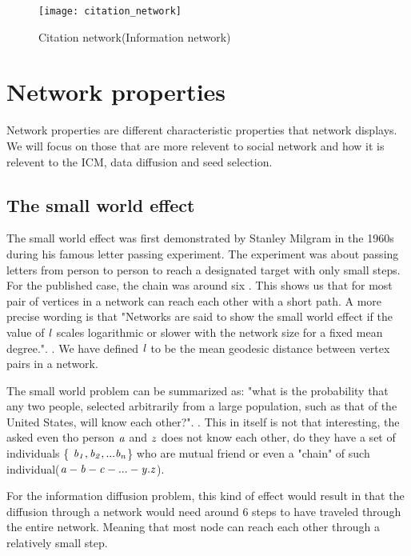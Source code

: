 \begin{figure}[!ht]
\centering
	\texttt{[image: citation\_network]}
	\caption{Citation network(Information network)} 
	\label{fig:CitationN}
\end{figure}

\section{Network properties}
Network properties are different characteristic properties that network displays. We will focus on those that are more relevent to social network and how it is relevent to the ICM, data diffusion and seed selection.


\subsection{The small world effect}\label{sec:SmallWorldEffect}

The small world effect was first demonstrated by Stanley Milgram in the 1960s during his famous letter passing experiment\cite{SmallWorldProblemSmilgram1960}. The experiment was about passing letters from person to person to reach a designated target with only small steps. For the published case, the chain was around six \cite{Experiment1969}. This shows us that for most pair of vertices in a network can reach each other with a short path. A more precise wording is that "Networks are said to show the small world effect if the value of $\it{l}$ scales logarithmic or slower with the network size for a fixed mean degree.". \cite{ComplexNetwork2003}. We have defined $\it{l} $ to be the mean geodesic distance between vertex pairs in a network.

The small world problem can be summarized as: "what is the probability that any two people, selected arbitrarily from a large population, such as that of the United States, will know each other?". \cite{smallworldExperiment1969}. This in itself is not that interesting, the \cite{SmallworldExperiment1969} asked even tho  person $\it{a}$ and $\it{z}$ does not know each other, do they have a set of individuals \{ $\it {b_1, b_2, ... b_n} $\} who are mutual friend or even a "chain" of such individual($\it {a-b-c-...-y.z}$).

For the information diffusion problem, this kind of effect would result in that the  diffusion through a network would need around 6 steps to have traveled through the entire network. Meaning that most node can reach each other through a relatively small step.

